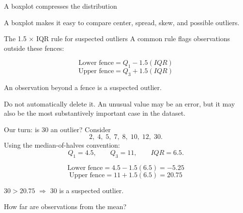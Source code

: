\documentclass[11pt,aspectratio=169]{beamer}
\begin{document}
\begin{frame}{A boxplot compresses the distribution}
\centering
{}

\vspace{1.0em}
A boxplot makes it easy to compare \alert{center}, \alert{spread}, \alert{skew}, and possible \alert{outliers}.
\end{frame}

\begin{frame}{The 1.5 $\times$ IQR rule for suspected outliers}
A common rule flags observations outside these fences:

\[
\boxed{\text{Lower fence}=Q_1-1.5(IQR)}
\]
\[
\boxed{\text{Upper fence}=Q_3+1.5(IQR)}
\]

\vspace{0.7em}
An observation beyond a fence is a \alert{suspected outlier}.

\vfill
\begin{alertblock}{Do not automatically delete it.}
An unusual value may be an error, but it may also be the most substantively important case in the dataset.
\end{alertblock}
\end{frame}

\begin{frame}{Our turn: is 30 an outlier?}
Consider
\[
2,\;4,\;5,\;7,\;8,\;10,\;12,\;30.
\]
Using the median-of-halves convention:
\[
Q_1=4.5,\qquad Q_3=11,\qquad IQR=6.5.
\]

\[
\text{Lower fence}=4.5-1.5(6.5)=-5.25
\]
\[
\text{Upper fence}=11+1.5(6.5)=20.75
\]

\begin{center}
\Large $30>20.75$ \qquad $\Rightarrow$ \qquad \alert{30 is a suspected outlier.}
\end{center}
\end{frame}

\begin{frame}[standout]
\Large How far are observations from the mean?
\end{frame}
\end{document}
